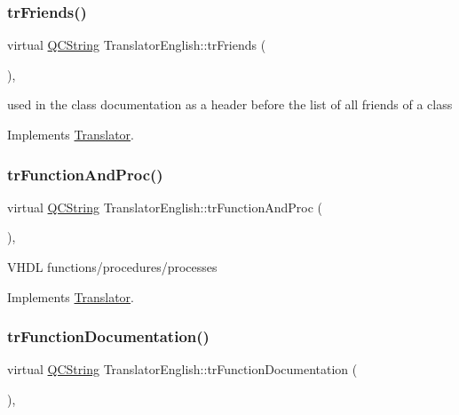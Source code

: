 \subsubsection{\texorpdfstring{trFriends()}{trFriends()}}
{\footnotesize\ttfamily virtual \mbox{\hyperlink{class_q_c_string}{Q\+C\+String}} Translator\+English\+::tr\+Friends (\begin{DoxyParamCaption}{ }\end{DoxyParamCaption})\hspace{0.3cm}{\ttfamily [inline]}, {\ttfamily [virtual]}}

used in the class documentation as a header before the list of all friends of a class 

Implements \mbox{\hyperlink{class_translator}{Translator}}.

\mbox{\label{class_translator_english_a19105e9f1786a84c39c1144b24d6a1b0}} 
\subsubsection{\texorpdfstring{trFunctionAndProc()}{trFunctionAndProc()}}
{\footnotesize\ttfamily virtual \mbox{\hyperlink{class_q_c_string}{Q\+C\+String}} Translator\+English\+::tr\+Function\+And\+Proc (\begin{DoxyParamCaption}{ }\end{DoxyParamCaption})\hspace{0.3cm}{\ttfamily [inline]}, {\ttfamily [virtual]}}

V\+H\+DL functions/procedures/processes 

Implements \mbox{\hyperlink{class_translator}{Translator}}.

\mbox{\label{class_translator_english_a6df9102d0ae2335b438df01853e0e1c1}} 
\subsubsection{\texorpdfstring{trFunctionDocumentation()}{trFunctionDocumentation()}}
{\footnotesize\ttfamily virtual \mbox{\hyperlink{class_q_c_string}{Q\+C\+String}} Translator\+English\+::tr\+Function\+Documentation (\begin{DoxyParamCaption}{ }\end{DoxyParamCaption})\hspace{0.3cm}{\ttfamily [inline]}, {\ttfamily [virtual]}}

